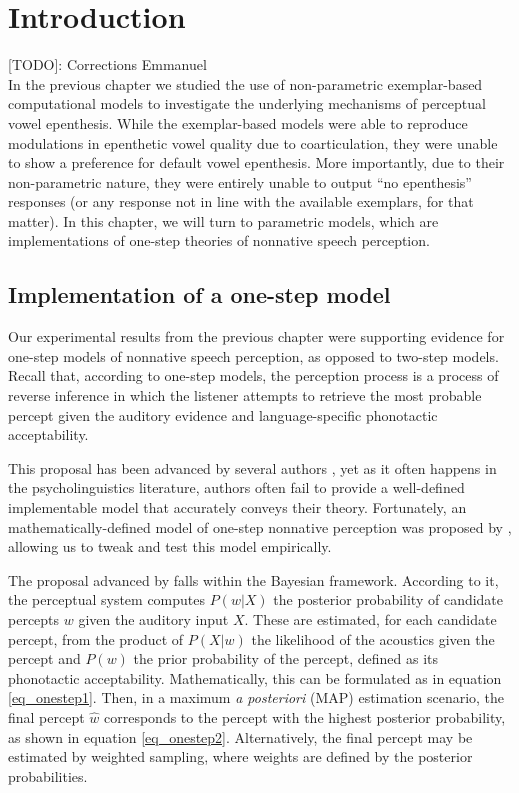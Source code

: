 \newpage
\section{Introduction}

{\color{red}[TODO]: Corrections Emmanuel} \\

In the previous chapter we studied the use of non-parametric exemplar-based computational models to investigate the underlying mechanisms of perceptual vowel epenthesis. While the exemplar-based models were able to reproduce modulations in epenthetic vowel quality due to coarticulation, they were unable to show a preference for default vowel epenthesis. More importantly, due to their non-parametric nature, they were entirely unable to output ``no epenthesis'' responses (or any response not in line with the available exemplars, for that matter). In this chapter, we will turn to parametric models, which are implementations of one-step theories of nonnative speech perception.  

\subsection{Implementation of a one-step model}
Our experimental results from the previous chapter were supporting evidence for one-step models of nonnative speech perception, as opposed to two-step models.
Recall that, according to one-step models, the perception process is a process of reverse inference in which the listener attempts to retrieve the most probable percept given the auditory evidence and language-specific phonotactic acceptability.

This proposal has been advanced by several authors \cite{dupoux2011, dejong2012, wilson2013, durvasula2015}, yet as it often happens in the psycholinguistics literature, authors often fail to provide a well-defined implementable model that accurately conveys their theory. Fortunately, an mathematically-defined model of one-step nonnative perception was proposed by \cite{wilson2013}, allowing us to tweak and test this model empirically.

The proposal advanced by \cite{wilson2013} falls within the Bayesian framework. 
According to it, the perceptual system computes $P(w | X)$ the posterior probability of candidate percepts $w$ given the auditory input $X$. These are estimated, for each candidate percept, from the product of $P(X|w)$ the likelihood of the acoustics given the percept and $P(w)$ the prior probability of the percept, defined as its phonotactic acceptability. Mathematically, this can be formulated as in equation \ref{eq_onestep1}. Then, in a maximum \textit{a posteriori} (MAP) estimation scenario, the final percept $\widehat{w}$ corresponds to the percept with the highest posterior probability, as shown in equation \ref{eq_onestep2}. Alternatively, the final percept may be estimated by weighted sampling, where weights are defined by the posterior probabilities.     

